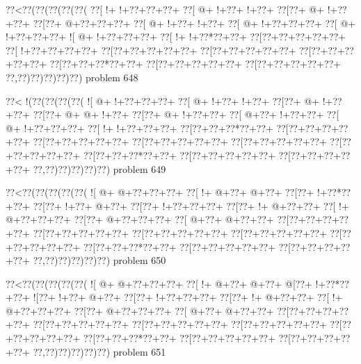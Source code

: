 \vbox{\vbox{\goo
\0??<\0??(\0??(\0??(\0??(\0??(
\0??[\- !+\- !+\0??+\0??+\0??+
\0??[\- @+\- !+\0??+\- !+\0??+
\0??[\0??+\- @+\- !+\0??+\0??+
\0??[\0??+\- @+\0??+\0??+\0??+
\0??[\- @+\- !+\0??+\- !+\0??+
\0??[\- @+\- !+\0??+\0??+\0??+
\0??[\- @+\- !+\0??+\0??+\0??+
\- ![\- @+\- !+\0??+\0??+\0??+
\0??[\- !+\- !+\0??*\0??+\0??+
\0??[\0??+\0??+\0??+\0??+\0??+
\0??[\- !+\0??+\0??+\0??+\0??+
\0??[\0??+\0??+\0??+\0??+\0??+
\0??[\0??+\0??+\0??+\0??+\0??+
\0??[\0??+\0??+\0??+\0??+\0??+
\0??[\0??+\0??+\0??*\0??+\0??+
\0??[\0??+\0??+\0??+\0??+\0??+
\0??[\0??+\0??+\0??+\0??+\0??+
\0??,\0??)\0??)\0??)\0??)\0??)
}
\hfil problem 648\hfil\break
}

\vbox{\vbox{\goo
\0??<\- !(\0??(\0??(\0??(\0??(
\- ![\- @+\- !+\0??+\0??+\0??+
\0??[\- @+\- !+\0??+\- !+\0??+
\0??[\0??+\- @+\- !+\0??+\0??+
\0??[\0??+\- @+\- @+\- !+\0??+
\0??[\0??+\- @+\- !+\0??+\0??+
\0??[\- @+\0??+\- !+\0??+\0??+
\0??[\- @+\- !+\0??+\0??+\0??+
\0??[\- !+\- !+\0??+\0??+\0??+
\0??[\0??+\0??+\0??*\0??+\0??+
\0??[\0??+\0??+\0??+\0??+\0??+
\0??[\0??+\0??+\0??+\0??+\0??+
\0??[\0??+\0??+\0??+\0??+\0??+
\0??[\0??+\0??+\0??+\0??+\0??+
\0??[\0??+\0??+\0??+\0??+\0??+
\0??[\0??+\0??+\0??*\0??+\0??+
\0??[\0??+\0??+\0??+\0??+\0??+
\0??[\0??+\0??+\0??+\0??+\0??+
\0??,\0??)\0??)\0??)\0??)\0??)
}
\hfil problem 649\hfil\break
}

\vbox{\vbox{\goo
\0??<\0??(\0??(\0??(\0??(\0??(
\- ![\- @+\- @+\0??+\0??+\0??+
\0??[\- !+\- @+\0??+\- @+\0??+
\0??[\0??+\- !+\0??*\0??+\0??+
\0??[\0??+\- !+\0??+\- @+\0??+
\0??[\0??+\- !+\0??+\0??+\0??+
\0??[\0??+\- !+\- @+\0??+\0??+
\0??[\- !+\- @+\0??+\0??+\0??+
\0??[\0??+\- @+\0??+\0??+\0??+
\0??[\- @+\0??+\- @+\0??+\0??+
\0??[\0??+\0??+\0??+\0??+\0??+
\0??[\0??+\0??+\0??+\0??+\0??+
\0??[\0??+\0??+\0??+\0??+\0??+
\0??[\0??+\0??+\0??+\0??+\0??+
\0??[\0??+\0??+\0??+\0??+\0??+
\0??[\0??+\0??+\0??*\0??+\0??+
\0??[\0??+\0??+\0??+\0??+\0??+
\0??[\0??+\0??+\0??+\0??+\0??+
\0??,\0??)\0??)\0??)\0??)\0??)
}
\hfil problem 650\hfil\break
}

\vbox{\vbox{\goo
\0??<\0??(\0??(\0??(\0??(\0??(
\- ![\- @+\- @+\0??+\0??+\0??+
\0??[\- !+\- @+\0??+\- @+\0??+
\- @[\0??+\- !+\0??*\0??+\0??+
\- ![\0??+\- !+\0??+\- @+\0??+
\0??[\0??+\- !+\0??+\0??+\0??+
\0??[\0??+\- !+\- @+\0??+\0??+
\0??[\- !+\- @+\0??+\0??+\0??+
\0??[\0??+\- @+\0??+\0??+\0??+
\0??[\- @+\0??+\- @+\0??+\0??+
\0??[\0??+\0??+\0??+\0??+\0??+
\0??[\0??+\0??+\0??+\0??+\0??+
\0??[\0??+\0??+\0??+\0??+\0??+
\0??[\0??+\0??+\0??+\0??+\0??+
\0??[\0??+\0??+\0??+\0??+\0??+
\0??[\0??+\0??+\0??*\0??+\0??+
\0??[\0??+\0??+\0??+\0??+\0??+
\0??[\0??+\0??+\0??+\0??+\0??+
\0??,\0??)\0??)\0??)\0??)\0??)
}
\hfil problem 651\hfil\break
}

